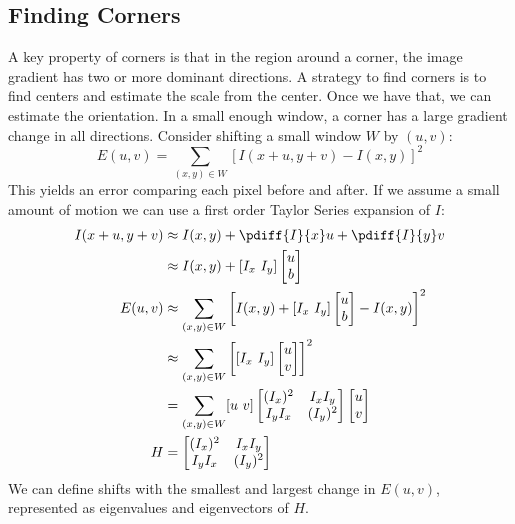 \documentclass{math}
\begin{document}
\subsection*{Finding Corners}
A key property of corners is that in the region around a corner, the image
gradient has two or more dominant directions. A strategy to find corners is to
find centers and estimate the scale from the center. Once we have that, we can
estimate the orientation. In a small enough window, a corner has a large
gradient change in all directions. Consider shifting a small window \( W \) by
\( (u,v) \):
\[ E(u,v) = \sum_{(x,y)\in W}[I(x+u,y+v)-I(x,y)]^2 \]
This yields an error comparing each pixel before and after. If we assume a
small amount of motion we can use a first order Taylor Series expansion of
\( I \):
\begin{align*}
  I(x+u,y+v) &\approx I(x,y)+\pdiff{I}{x}u+\pdiff{I}{y}v \\
  &\approx I(x,y)+[I_x\ I_y]\begin{bmatrix}u \\ b\end{bmatrix} \\
  E(u,v) &\approx \sum_{(x,y)\in W}\left[I(x,y)+[I_x\ I_y]
    \begin{bmatrix}u \\ b\end{bmatrix}-I(x,y)\right]^2 \\
  &\approx \sum_{(x,y)\in W}\left[[I_x\ I_y]\begin{bmatrix}u \\ v\end{bmatrix}\right]^2 \\
  &= \sum_{(x,y)\in W}[u\ v]\begin{bmatrix}
    (I_x)^2 & I_xI_y \\
    I_yI_x & (I_y)^2 \\
  \end{bmatrix}\begin{bmatrix}u \\ v\end{bmatrix} \\
  H &= \begin{bmatrix}
    (I_x)^2 & I_xI_y \\
    I_yI_x & (I_y)^2 \\
  \end{bmatrix}
\end{align*}
We can define shifts with the smallest and largest change in \( E(u,v) \),
represented as eigenvalues and eigenvectors of \( H \).
\end{document}
